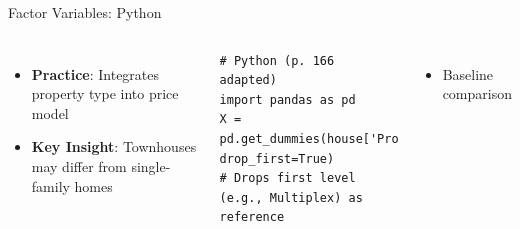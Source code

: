 \documentclass{beamer}
\begin{document}
	
	
	\begin{frame}[fragile]{Factor Variables: Python}
		\lstset{language=Python}
		\begin{columns}
			\begin{itemize}
				\item \textbf{Practice}: Integrates property type into price model
				\item \textbf{Key Insight}: Townhouses may differ from single-family homes
			\end{itemize}
			\begin{lstlisting}
# Python (p. 166 adapted)
import pandas as pd
X = pd.get_dummies(house['PropertyType'], drop_first=True)
# Drops first level (e.g., Multiplex) as reference
			\end{lstlisting}
			\begin{itemize}
				\item Baseline comparison
			\end{itemize}
		\end{columns}
	\end{frame}
	
\end{document}
